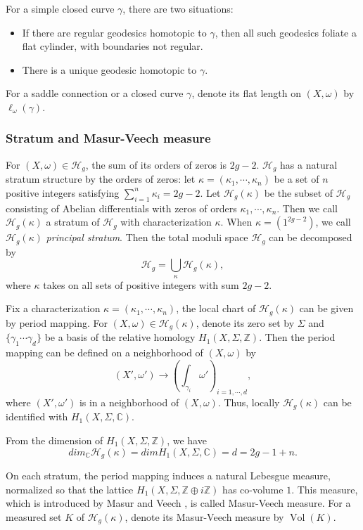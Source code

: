 \documentclass[12pt]{amsart} %
\theoremstyle{definition}
\theoremstyle{remark}
\numberwithin{equation}{section}
\renewcommand\H{{\mathcal H}}
\newcommand{\V}{\operatorname{Vol}}
\begin{document}
For a simple closed curve $\gamma$, there are two situations:
\begin{itemize}
  \item[1]  If there are regular geodesics homotopic to $\gamma$, then all such geodesics foliate a flat cylinder, with boundaries not regular.
  \item[2]  There is a unique geodesic homotopic to $\gamma$.
\end{itemize}

For a saddle connection or a closed curve $\gamma$, denote its flat length on $(X,\omega)$ by $\ell_\omega(\gamma)$.
\subsubsection{Stratum and Masur-Veech measure}
For $(X,\omega) \in \H_g$, the sum of its orders of zeros is $2g-2$.
$\H_g$ has a natural stratum structure by the orders of zeros:
let $\kappa=(\kappa_1,\cdots,\kappa_n)$ be a set of $n$ positive integers satisfying $\sum_{i=1}^{n}\kappa_i=2g-2$.
Let $\H_g(\kappa)$ be the subset of $\H_g$ consisting of Abelian differentials with zeros of orders $\kappa_1,\cdots,\kappa_n$.
Then we call $\H_g(\kappa)$ a stratum of $\H_g$ with characterization $\kappa$.
When $\kappa=(1^{2g-2})$, we call $\H_g(\kappa)$ \emph{principal stratum}.
Then the total moduli space $\H_g$ can be decomposed by 
$$\H_g=\bigcup_\kappa \H_g(\kappa),$$
where $\kappa$ takes on all sets of positive integers with sum $2g-2$.


Fix a characterization $\kappa=(\kappa_1,\cdots,\kappa_n)$, the local chart of $\H_g(\kappa)$ can be given by period mapping.
For $(X,\omega)\in \H_g(\kappa)$, denote its zero set by $\Sigma$ and $\{\gamma_1\cdots \gamma_d\}$ be a basis of the relative
homology $H_1(X,\Sigma,\mathbb{Z})$. Then the period mapping can be defined on a neighborhood of $(X,\omega)$ by
$$(X',\omega')\to \left( \int_{\gamma_i}\omega'\right)_{i=1,\cdots,d},$$
where $(X',\omega')$ is in a neighborhood of $(X,\omega)$.
Thus, locally $\H_g(\kappa)$ can be identified with $H_1(X,\Sigma,\mathbb{C})$.


From the dimension of $H_1(X,\Sigma,\mathbb{Z})$, we have
$$dim_{\mathbb{C}}\H_g(\kappa)=dimH_1(X,\Sigma,\mathbb{C})=d=2g-1+n.$$


On each stratum, the period mapping induces a natural Lebesgue measure, normalized so that the lattice $H_1(X,\Sigma,\mathbb{Z}\oplus i\mathbb{Z})$ has co-volume $1$.
This measure, which is introduced by Masur \cite{masur1982interval} and Veech \cite{veech1982gauss}, is called Masur-Veech measure.
For a measured set $K$ of $\H_g(\kappa)$, denote its Masur-Veech measure by $\V(K)$.
\end{document}
